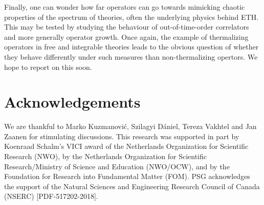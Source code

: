 Finally, one can wonder how far operators can go towards mimicking chaotic properties of the spectrum of theories, often the underlying physics behind ETH. This may be tested by studying the behaviour of out-of-time-order correlators and more generally operator growth. Once again, the example of thermalizing operators in free and integrable theories leads to the obvious question of whether they behave differently under such measures than non-thermalizing opertors. We hope to report on this soon.

\section*{Acknowledgements}
We are thankful to Marko Kuzmanovi\'{c}, Szilagyi D\'{a}niel, Tereza Vakhtel and Jan Zaanen for stimulating discussions. This research was supported in part by Koenraad Schalm’s VICI award of the Netherlands  Organization  for  Scientific  Research  (NWO),  by  the  Netherlands  Organization  for Scientific Research/Ministry of Science and Education (NWO/OCW), and by the Foundation for Research into Fundamental Matter (FOM). PSG acknowledges the support of the Natural Sciences and Engineering Research Council of Canada (NSERC) [PDF-517202-2018].


